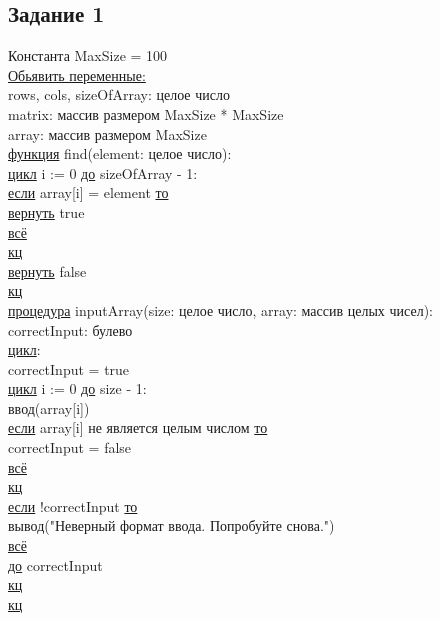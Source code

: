 \subsection*{Задание 1}

Константа MaxSize = 100\\

\noindent \underline{Обьявить переменные:}\\
\null\qquad rows, cols, sizeOfArray: целое число\\
\null\qquad matrix: массив размером MaxSize * MaxSize\\
\null\qquad array: массив размером MaxSize\\

\noindent \underline{функция} find(element: целое число):\\
\null\qquad \underline{цикл} i := 0 \underline{до} sizeOfArray - 1:\\
\null\qquad \qquad \underline{если} array[i] = element \underline{то}\\
\null\qquad \qquad \qquad \underline{вернуть} true\\
\null\qquad \qquad \underline{всё}\\
\null\qquad \underline{кц}\\
\null\qquad \underline{вернуть} false\\
\underline{кц}\\

\noindent \underline{процедура} inputArray(size: целое число, array: массив целых чисел):\\
\null\qquad correctInput: булево\\
\null\qquad \underline{цикл}:\\
\null\qquad \qquad correctInput = true\\
\null\qquad \qquad \underline{цикл} i := 0 \underline{до} size - 1:\\
\null\qquad \qquad \qquad ввод(array[i])\\
\null\qquad \qquad \qquad \underline{если} array[i] не является целым числом \underline{то}\\
\null\qquad \qquad \qquad \qquad correctInput = false\\
\null\qquad \qquad \qquad \underline{всё}\\
\null\qquad \qquad \underline{кц}\\
\null\qquad \qquad \underline{если} !correctInput \underline{то}\\
\null\qquad \qquad \qquad вывод("Неверный формат ввода. Попробуйте снова.")\\
\null\qquad \qquad \underline{всё}\\
\null\qquad \underline{до} correctInput\\
\null\qquad \underline{кц}\\
\underline{кц}\\

